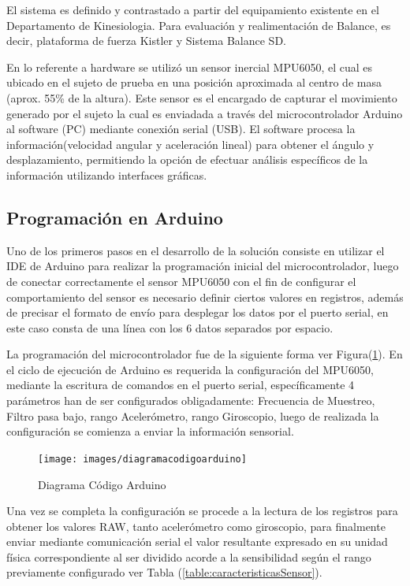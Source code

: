 \documentclass[12pt,a4paper]{article}
\begin{document}
El sistema es definido y contrastado a partir del equipamiento existente en el Departamento de Kinesiologia. Para evaluación y realimentación de Balance, es decir, plataforma de fuerza Kistler y Sistema Balance SD.

En lo referente a hardware se utilizó un sensor inercial MPU6050, el cual es ubicado en el sujeto de prueba en una posición aproximada al centro de masa (aprox. 55\% de la altura). Este sensor es el encargado de capturar el movimiento generado por el sujeto la cual es  enviadada a través del microcontrolador Arduino al software (PC) mediante conexión serial (USB). El software procesa la información(velocidad angular y aceleración lineal) para obtener el ángulo y desplazamiento, permitiendo la opción de efectuar análisis específicos de la información utilizando interfaces gráficas.


\subsection{Programación en Arduino}
Uno de los primeros pasos en el desarrollo de la solución consiste en utilizar el IDE de Arduino para realizar la programación inicial del microcontrolador, luego de conectar correctamente el sensor MPU6050 con el fin de configurar el comportamiento del sensor es necesario definir ciertos valores en registros, además de precisar el formato de envío para desplegar los datos por el puerto serial, en este caso consta de una línea con los 6 datos separados por espacio.

La programación del microcontrolador fue de la siguiente forma ver Figura(\ref{fig:arduinocode}).
En el ciclo de ejecución de Arduino es requerida la configuración del MPU6050, mediante la escritura de comandos en el puerto serial, específicamente 4 parámetros han de ser configurados obligadamente: Frecuencia de Muestreo, Filtro pasa bajo, rango Acelerómetro, rango Giroscopio, luego de realizada la configuración se comienza a enviar la información sensorial.

\begin{figure}[H]
	\centering
	\texttt{[image: images/diagramacodigoarduino]}
	\caption{Diagrama Código Arduino}
	\label{fig:arduinocode}
\end{figure}

Una vez se completa la configuración se procede a la lectura de los registros para obtener los valores RAW, tanto acelerómetro como giroscopio, para finalmente enviar mediante comunicación serial el valor resultante expresado en su unidad física correspondiente al ser dividido acorde a la sensibilidad según el rango previamente configurado ver Tabla (\ref{table:caracteristicasSensor}).
\end{document}

